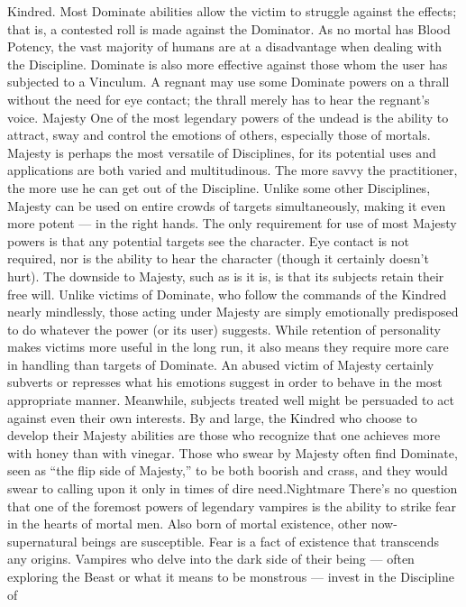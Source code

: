 \documentclass[10pt,a4paper]{article}
\begin{document}
Kindred. Most Dominate abilities allow the victim to struggle against the
effects; that is, a contested roll is made against the Dominator. As no mortal
has Blood Potency, the vast majority of humans are at a disadvantage when
dealing with the Discipline.
Dominate is also more effective against those whom the user has subjected
to a Vinculum. A regnant may use some Dominate powers on a thrall
without the need for eye contact; the thrall merely has to hear the regnant’s
voice.
Majesty
One of the most legendary powers of the undead is the ability to attract,
sway and control the emotions of others, especially those of mortals.
Majesty is perhaps the most versatile of Disciplines, for its potential uses
and applications are both varied and multitudinous. The more savvy the
practitioner, the more use he can get out of the Discipline. Unlike some
other Disciplines, Majesty can be used on entire crowds of targets
simultaneously, making it even more potent — in the right hands. The only
requirement for use of most Majesty powers is that any potential targets see
the character. Eye contact is not required, nor is the ability to hear the
character (though it certainly doesn’t hurt).
The downside to Majesty, such as is it is, is that its subjects retain their free
will. Unlike victims of Dominate, who follow the commands of the Kindred
nearly mindlessly, those acting under Majesty are simply emotionally
predisposed to do whatever the power (or its user) suggests. While retention
of personality makes victims more useful in the long run, it also means they
require more care in handling than targets of Dominate. An abused victim of
Majesty certainly subverts or represses what his emotions suggest in order
to behave in the most appropriate manner. Meanwhile, subjects treated well
might be persuaded to act against even their own interests.
By and large, the Kindred who choose to develop their Majesty abilities are
those who recognize that one achieves more with honey than with vinegar.
Those who swear by Majesty often find Dominate, seen as “the flip side of
Majesty,” to be both boorish and crass, and they would swear to calling
upon it only in times of dire need.Nightmare
There’s no question that one of the foremost powers of legendary vampires
is the ability to strike fear in the hearts of mortal men. Also born of mortal
existence, other now-supernatural beings are susceptible. Fear is a fact of
existence that transcends any origins.
Vampires who delve into the dark side of their being — often exploring the
Beast or what it means to be monstrous — invest in the Discipline of
\end{document}
